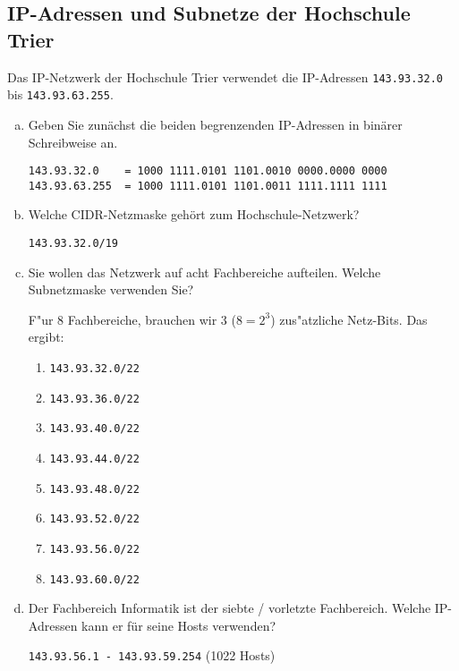 \setcounter{section}{4}
\setcounter{subsection}{5} %
\subsection{IP-Adressen und Subnetze der Hochschule Trier}

Das IP-Netzwerk der Hochschule Trier verwendet die IP-Adressen
\verb|143.93.32.0| bis \verb|143.93.63.255|.

\begin{enumerate}[(a)]
    \item Geben Sie zunächst die beiden begrenzenden IP-Adressen in binärer
        Schreibweise an.

\begin{verbatim}
143.93.32.0    = 1000 1111.0101 1101.0010 0000.0000 0000
143.93.63.255  = 1000 1111.0101 1101.0011 1111.1111 1111
\end{verbatim}

    \item Welche CIDR-Netzmaske gehört zum Hochschule-Netzwerk?

        \verb|143.93.32.0/19|

    \item Sie wollen das Netzwerk auf acht Fachbereiche aufteilen. Welche
        Subnetzmaske verwenden Sie?

        F"ur 8 Fachbereiche, brauchen wir 3 ($8 = 2^3$) zus"atzliche Netz-Bits. Das ergibt:

        \begin{enumerate}[1.]
            \item \verb|143.93.32.0/22|
            \item \verb|143.93.36.0/22|
            \item \verb|143.93.40.0/22|
            \item \verb|143.93.44.0/22|
            \item \verb|143.93.48.0/22|
            \item \verb|143.93.52.0/22|
            \item \verb|143.93.56.0/22|
            \item \verb|143.93.60.0/22|
        \end{enumerate}

    \item Der Fachbereich Informatik ist der siebte / vorletzte Fachbereich. Welche IP-
        Adressen kann er für seine Hosts verwenden?

        \verb|143.93.56.1 - 143.93.59.254| (1022 Hosts)
\end{enumerate}
